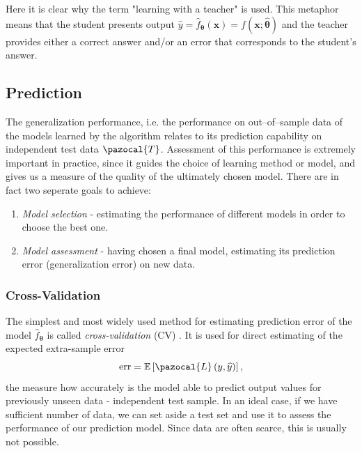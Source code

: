 Here it is clear why the term "learning with a teacher" is used. This metaphor means that the student presents output $\widehat{y} = \widehat{f}_{\boldsymbol{\theta}}\left(\boldsymbol{x}\right) = f(\boldsymbol{x}; \widehat{\boldsymbol{\theta}})$ and the teacher provides either a correct answer and/or an error that corresponds to the student's answer. 

\subsection{Prediction}
The generalization performance, i.e. the performance on out--of--sample data of the models learned by the algorithm relates to its prediction capability on independent test data $\pazocal{T}$. Assessment of this performance is extremely important in practice, since it guides the choice of learning
method or model, and gives us a measure of the quality of the ultimately
chosen model. There are in fact two seperate goals to achieve:
\begin{enumerate}
    \item \emph{Model selection} - estimating the performance of different models in order
to choose the best one.
    \item \emph{Model assessment} - having chosen a final model, estimating its prediction
error (generalization error) on new data.
\end{enumerate}
\subsubsection{Cross-Validation}
The simplest and most widely used method for estimating prediction error of  the model $\hat{f}_{\boldsymbol{\theta}}$ is called \emph{cross-validation} (CV) \cite{statistics}. It is used for direct estimating of the expected extra-sample error
\begin{equation}
\mathrm{err} = \E\left[\pazocal{L}\left(y, \widehat{y}\right)\right],
\end{equation}
the measure how accurately is the model able to predict output values for previously unseen data - independent test sample. In an ideal case, if we have sufficient number of data, we can set aside a test set and use
it to assess the performance of our prediction model. Since data are often
scarce, this is usually not possible.

